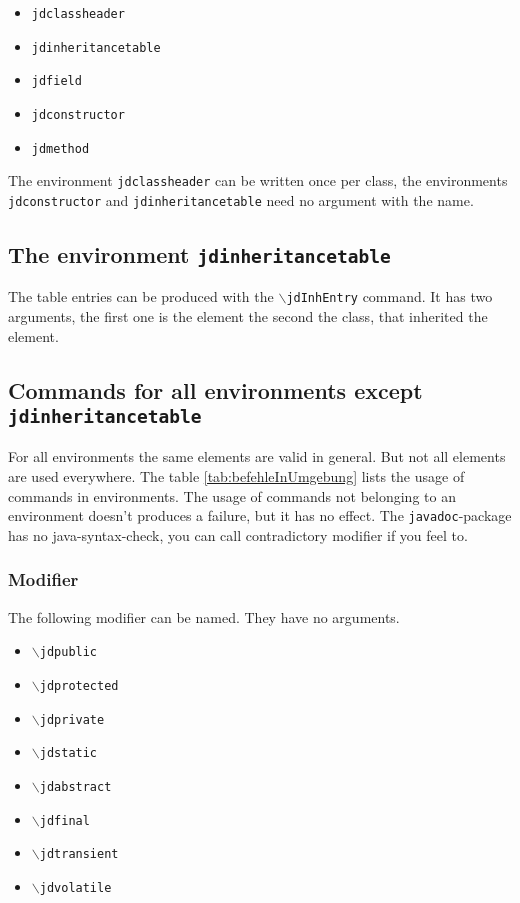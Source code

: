 \documentclass[11pt,a4paper]{article}
\newcommand{\code}[1]{\protect\texttt{#1}}
\newcommand{\befehl}[1]{\code{$\backslash$#1}}
\begin{document}
\begin{itemize}
	\item \code{jdclassheader}
	\item \code{jdinheritancetable}
	\item \code{jdfield}
	\item \code{jdconstructor}
	\item \code{jdmethod}
\end{itemize}

The environment \code{jdclassheader} can be written once per class, the environments \code{jdconstructor} and \code{jdinheritancetable} need no argument with the name.

\subsection{The environment \protect\code{jdinheritancetable}}
The table entries can be produced with the \befehl{jdInhEntry} command. It has two arguments, the first one is the element the second the class, that inherited the element.

\subsection{Commands for all environments except \protect\code{jdinheritancetable}}
For all environments the same elements are valid in general. But not all elements are used everywhere. The table \ref{tab:befehleInUmgebung} lists the usage of commands in environments. The usage of commands not belonging to an environment doesn't produces a failure, but it has no effect. The  \code{javadoc}-package has no java-syntax-check, you can call contradictory modifier if you feel to.

\subsubsection{Modifier}
The following modifier can be named. They have no arguments.
\begin{itemize}
	\item \befehl{jdpublic}
	\item \befehl{jdprotected}
	\item \befehl{jdprivate}
	\item \befehl{jdstatic}
	\item \befehl{jdabstract}
	\item \befehl{jdfinal}
	\item \befehl{jdtransient}
	\item \befehl{jdvolatile}
\end{itemize}
\end{document}
